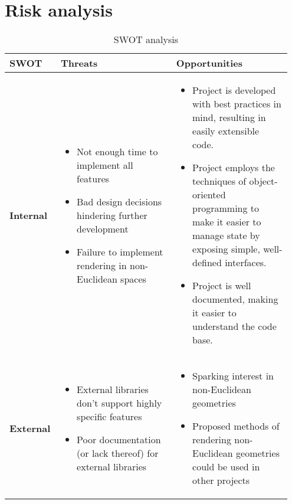 \section{Risk analysis}

\begin{table}[H]
    \centering
    \begin{tabular}{|p{0.15\linewidth}|p{0.4\linewidth}|p{0.4\linewidth}|}
        \hline
        \textbf{SWOT} & \textbf{Threats}                                                                             & \textbf{Opportunities} \\ \hline
        \textbf{Internal}
                      & \begin{itemize}
                            \itemsep0em
                            \item Not enough time to implement all features
                            \item Bad design decisions hindering further development
                            \item Failure to implement rendering in non-Euclidean spaces
                        \end{itemize}
                      &
        \begin{itemize}
            \itemsep0em
            \item Project is developed with best practices in mind, resulting in easily extensible code.
            \item Project employs the techniques of object-oriented programming to make it easier to manage state by exposing simple, well-defined interfaces.
            \item Project is well documented, making it easier to understand the code base.
        \end{itemize}
        \\ \hline
        \textbf{External}
                      &
        \begin{itemize}
            \itemsep0em
            \item External libraries don't support highly specific features
            \item Poor documentation (or lack thereof) for external libraries
        \end{itemize}
                      & \begin{itemize}
                            \itemsep0em
                            \item Sparking interest in non-Euclidean geometries
                            \item Proposed methods of rendering non-Euclidean geometries could be used in other projects
                        \end{itemize}                           \\  \hline
    \end{tabular}
    \caption{SWOT analysis}
\end{table}